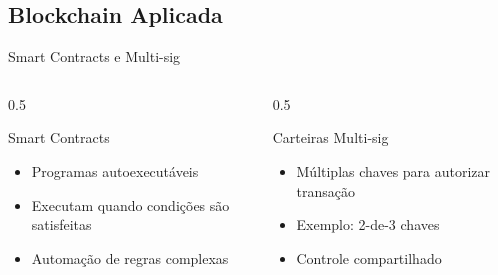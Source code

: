 \documentclass{libs/ufc_format}
\begin{document}
\subsection{Blockchain Aplicada}
\begin{frame}{Smart Contracts e Multi-sig}
    \begin{columns}
        \begin{column}{0.5\textwidth}
            \begin{block}{Smart Contracts}
                \begin{itemize}
                    \item Programas autoexecutáveis
                    \item Executam quando condições são satisfeitas
                    \item Automação de regras complexas
                \end{itemize}
            \end{block}
        \end{column}
        \begin{column}{0.5\textwidth}
            \begin{block}{Carteiras Multi-sig}
                \begin{itemize}
                    \item Múltiplas chaves para autorizar transação
                    \item Exemplo: 2-de-3 chaves
                    \item Controle compartilhado
                \end{itemize}
            \end{block}
        \end{column}
    \end{columns}
    
    \vspace{0.4cm}
    
\end{frame}
\end{document}
